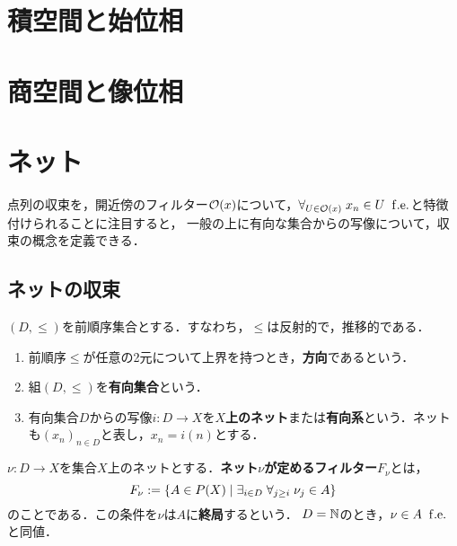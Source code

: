 \documentclass[uplatex,dvipdfmx]{jsreport}
\begin{document}
\section{積空間と始位相}

\section{商空間と像位相}

\section{ネット}

\begin{tcolorbox}[colframe=ForestGreen, colback=ForestGreen!10!white,breakable,colbacktitle=ForestGreen!40!white,coltitle=black,fonttitle=\bfseries\sffamily,
title=]
    点列の収束を，開近傍のフィルター$\mathcal{O}(x)$について，$\forall_{U\in\mathcal{O}(x)}\;x_n\in U\;\;\mathrm{f.e.}$と特徴付けられることに注目すると，
    一般の上に有向な集合からの写像について，収束の概念を定義できる．
\end{tcolorbox}

\subsection{ネットの収束}

\begin{definition}
    $(D,\le)$を前順序集合とする．すなわち，$\le$は反射的で，推移的である．
    \begin{enumerate}
        \item 前順序$\le$が任意の2元について上界を持つとき，\textbf{方向}であるという．
        \item 組$(D,\le)$を\textbf{有向集合}という．
        \item 有向集合$D$からの写像$i:D\to X$を\textbf{$X$上のネット}または\textbf{有向系}という．ネットも$(x_n)_{n\in D}$と表し，$x_n=i(n)$とする．
    \end{enumerate}
\end{definition}

\begin{definition}
        $\nu:D\to X$を集合$X$上のネットとする．\textbf{ネット$\nu$が定めるフィルター}$F_\nu$とは，
        \[F_\nu:=\left\{A\in P(X)\mid \exists_{i\in D}\;\forall_{j\ge i}\;\nu_j\in A\right\}\]
        のことである．この条件を$\nu$は$A$に\textbf{終局}するという．
        $D=\mathbb{N}$のとき，$\nu\in A\;\;\mathrm{f.e.}$と同値．
\end{definition}
\end{document}
